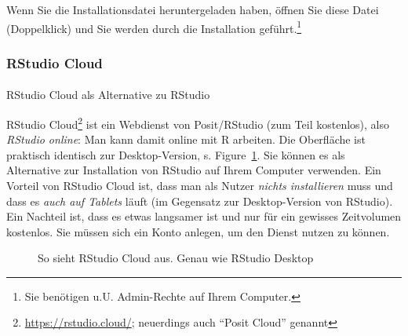\documentclass[
  letterpaper,
  DIV=11,
  numbers=noendperiod]{scrartcl}
\makeatletter
\let\oldparagraph\paragraph
\renewcommand{\paragraph}{
    \@ifstar
      \xxxParagraphStar
      \xxxParagraphNoStar
  }
\newcommand{\xxxParagraphStar}[1]{\oldparagraph*{#1}\mbox{}}
\newcommand{\xxxParagraphNoStar}[1]{\oldparagraph{#1}\mbox{}}
\theoremstyle{definition}
\theoremstyle{definition}
\theoremstyle{definition}
\theoremstyle{remark}
\makeatother
\begin{document}
Wenn Sie die Installationsdatei heruntergeladen haben, öffnen Sie diese
Datei (Doppelklick) und Sie werden durch die Installation
geführt.\footnote{Sie benötigen u.U. Admin-Rechte auf Ihrem Computer.}

\subsubsection{RStudio Cloud}\label{rstudio-cloud}

\paragraph{RStudio Cloud als Alternative zu
RStudio}\label{rstudio-cloud-als-alternative-zu-rstudio}

RStudio Cloud\footnote{\url{https://rstudio.cloud/}; neuerdings auch
  ``Posit Cloud'' genannt} ist ein Webdienst von Posit/RStudio (zum Teil
kostenlos), also \emph{RStudio online}: Man kann damit online mit R
arbeiten. Die Oberfläche ist praktisch identisch zur Desktop-Version, s.
Figure~\ref{fig-rstudio-cloud}. Sie können es als Alternative zur
Installation von RStudio auf Ihrem Computer verwenden. Ein Vorteil von
RStudio Cloud ist, dass man als Nutzer \emph{nichts installieren} muss
und dass es \emph{auch auf Tablets} läuft (im Gegensatz zur
Desktop-Version von RStudio). Ein Nachteil ist, dass es etwas langsamer
ist und nur für ein gewisses Zeitvolumen kostenlos. Sie müssen sich ein
Konto anlegen, um den Dienst nutzen zu können.

\begin{figure}


\caption{\label{fig-rstudio-cloud}So sieht RStudio Cloud aus. Genau wie
RStudio Desktop}

\end{figure}%
\end{document}
